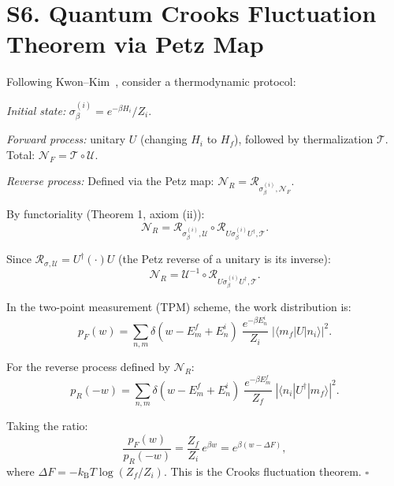 \documentclass[prl,twocolumn,superscriptaddress,longbibliography]{revtex4-2}
\newcommand{\kB}{k_{\mathrm{B}}}
\newcommand{\Petz}{\mathcal{R}}
\newcommand{\chan}{\mathcal{N}}
\newcommand{\ket}[1]{|#1\rangle}
\newcommand{\bra}[1]{\langle#1|}
\newcommand{\abs}[1]{\left|#1\right|}
\begin{document}
\section{S6. Quantum Crooks Fluctuation Theorem via Petz Map}
\label{sec:crooks}

Following Kwon--Kim~\cite{Kwon2019}, consider a thermodynamic protocol:

\emph{Initial state:} $\sigma_\beta^{(i)} = e^{-\beta H_i}/Z_i$.

\emph{Forward process:} unitary $U$ (changing $H_i$ to $H_f$), followed
by thermalization $\mathcal{T}$. Total: $\chan_F = \mathcal{T} \circ
\mathcal{U}$.

\emph{Reverse process:} Defined via the Petz map:
$\chan_R = \Petz_{\sigma_\beta^{(i)}, \chan_F}$.

By functoriality (Theorem 1, axiom (ii)):
\begin{equation}
\chan_R = \Petz_{\sigma_\beta^{(i)}, \mathcal{U}} \circ
\Petz_{U\sigma_\beta^{(i)}U^\dagger, \mathcal{T}}.
\end{equation}

Since $\Petz_{\sigma, \mathcal{U}} = U^\dagger(\cdot)U$ (the Petz
reverse of a unitary is its inverse):
\begin{equation}
\chan_R = \mathcal{U}^{-1} \circ
\Petz_{U\sigma_\beta^{(i)}U^\dagger, \mathcal{T}}.
\end{equation}

In the two-point measurement (TPM) scheme, the work distribution is:
\begin{equation}
p_F(w) = \sum_{n,m} \delta(w - E_m^f + E_n^i)\;
\frac{e^{-\beta E_n^i}}{Z_i}\;\abs{\bra{m_f}U\ket{n_i}}^2.
\end{equation}

For the reverse process defined by $\chan_R$:
\begin{equation}
p_R(-w) = \sum_{n,m} \delta(w - E_m^f + E_n^i)\;
\frac{e^{-\beta E_m^f}}{Z_f}\;\abs{\bra{n_i}U^\dagger\ket{m_f}}^2.
\end{equation}

Taking the ratio:
\begin{equation}
\frac{p_F(w)}{p_R(-w)} = \frac{Z_f}{Z_i}\, e^{\beta w}
= e^{\beta(w - \Delta F)},
\end{equation}
where $\Delta F = -\kB T \log(Z_f/Z_i)$. This is the Crooks
fluctuation theorem. \hfill$\square$
\end{document}
